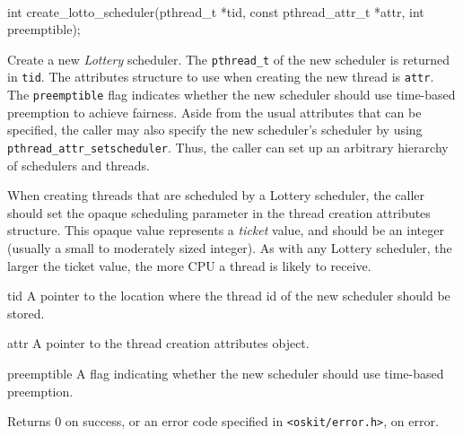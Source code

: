 \begin{apisyn}
	\\

	\funcproto int create_lotto_scheduler(pthread_t *tid,
			const pthread_attr_t *attr, int preemptible);
\end{apisyn}
\begin{apidesc}
	Create a new \emph{Lottery} scheduler. The \texttt{pthread_t}
	of the new scheduler is returned in \texttt{tid}. The attributes
	structure to use when creating the new thread is \texttt{attr}. The
	\texttt{preemptible} flag indicates whether the new scheduler
	should use time-based preemption to achieve fairness.  Aside from
	the usual attributes that can be specified, the caller may also
	specify the new scheduler's scheduler by using
	\texttt{pthread_attr_setscheduler}. Thus, the caller can set up an
	arbitrary hierarchy of schedulers and threads.

	When creating threads that are scheduled by a Lottery scheduler,
	the caller should set the opaque scheduling parameter in the thread
	creation attributes structure. This opaque value represents a
	\emph{ticket} value, and should be an integer (usually a small to
	moderately sized integer). As with any Lottery scheduler, the
	larger the ticket value, the more CPU a thread is likely to
	receive. 
\end{apidesc}
\begin{apiparm}
	\item[tid]
		A pointer to the location where the thread id of the new
		scheduler should be stored. 
	\item[attr]
		A pointer to the thread creation attributes object.
	\item[preemptible]
		A flag indicating whether the new scheduler should use
		time-based preemption.
\end{apiparm}
\begin{apiret}
	Returns 0 on success, or an error code specified in
	{\tt <oskit/error.h>}, on error.
\end{apiret}


